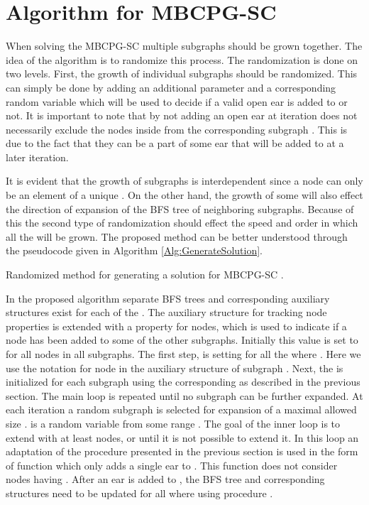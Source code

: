 \section{Algorithm for MBCPG-SC}

When solving the MBCPG-SC multiple subgraphs  should be grown together. The idea of the algorithm is to randomize this process. The randomization is done on two levels. First,  the growth of individual subgraphs  should be randomized. This can simply be done by adding an additional parameter   and a corresponding random variable  which will be used to decide if a valid open ear is added to  or not. It is important to note that by not adding an open ear  at iteration   does not necessarily exclude the nodes inside  from the corresponding subgraph . This is due to the fact that they can be a part of some ear  that will be added to  at a later iteration. 

It is evident that the growth of subgraphs  is interdependent since a  node  can only be an element of a unique . On the other hand, the growth of some  will also effect the direction of expansion of the BFS tree of neighboring subgraphs. Because of this the second type of randomization should effect the speed and order in which all the  will be grown. The proposed method can be better understood through the pseudocode given in Algorithm \ref{Alg:GenerateSolution}.
\begin{algorithm}
\begin{algorithmic}
\State{}
\Repeat
\State{}
\State{}
\Until{  ) }
\EndWhile
\EndProcedure
\end{algorithmic}
\caption{\label{Alg:GenerateSolution} Randomized method for generating a solution for MBCPG-SC .}
\end{algorithm}


In the proposed algorithm  separate BFS trees and corresponding auxiliary structures exist for each of the . The auxiliary structure for tracking node properties is extended with a property  for nodes, which is used to indicate if a node has been added to some of the other subgraphs. Initially this value is set to  for all nodes in all subgraphs. The first step, is setting  for all the  where . Here we use the notation  for node  in the auxiliary structure of subgraph . Next, the  is initialized for each subgraph  using the corresponding  as described in the previous section. The main loop is repeated until no subgraph can be further expanded. At each iteration a random subgraph  is selected for expansion of a maximal allowed size .  is a random variable from some range . The goal of the inner loop is to extend  with at least  nodes, or until it is not possible to extend it. In this loop an adaptation of the procedure presented in the previous section  is used in the form of function  which only adds a single ear  to . This function does not consider nodes having . After an ear  is added to , the  BFS tree and corresponding structures need to be updated for all  where  using procedure . 

